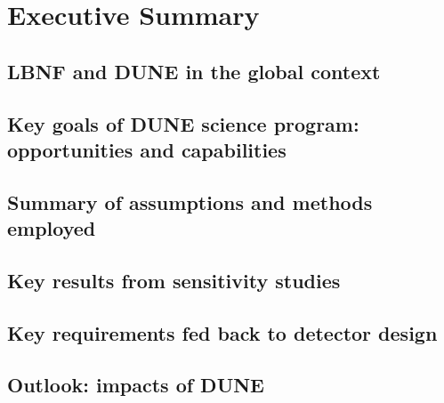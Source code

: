 \chapter{Executive Summary}
\label{ch:exec-summ}


\section{LBNF and DUNE in the global context}
\label{sec:exec-glob-context}


\section{Key goals of DUNE science program: opportunities and capabilities}
\label{sec:exec-key-goals}


\section{Summary of assumptions and methods employed}
\label{sec:exec-assm-meth}



\section{Key results from sensitivity studies}
\label{sec:exec-sensitiv-results}



\section{Key requirements fed back to detector design}
\label{sec:exec-key-reqs}



\section{Outlook: impacts of DUNE}
\label{sec:exec-impacts}
